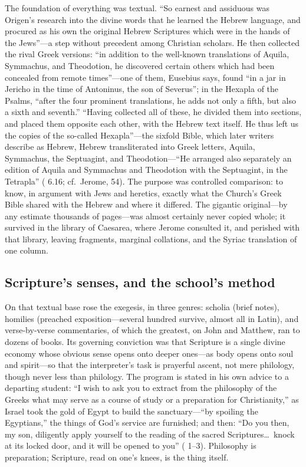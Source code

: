 The foundation of everything was textual. ``So earnest and assiduous was
Origen's research into the divine words that he learned the Hebrew language,
and procured as his own the original Hebrew Scriptures which were in the
hands of the Jews''---a step without precedent among Christian scholars. He
then collected the rival Greek versions: ``in addition to the well-known
translations of Aquila, Symmachus, and Theodotion, he discovered certain
others which had been concealed from remote times''---one of them, Eusebius
says, found ``in a jar in Jericho in the time of Antoninus, the son of
Severus''; in the Hexapla of the Psalms, ``after the four prominent
translations, he adds not only a fifth, but also a sixth and seventh.'' ``Having collected all of these, he divided them into sections, and
placed them opposite each other, with the Hebrew text itself. He thus left
us the copies of the so-called Hexapla''---the sixfold Bible, which later
writers describe as Hebrew, Hebrew transliterated into Greek letters,
Aquila, Symmachus, the Septuagint, and Theodotion---``He arranged also
separately an edition of Aquila and Symmachus and Theodotion with the
Septuagint, in the Tetrapla'' ( 6.16; cf.\ Jerome,
 54). The purpose was controlled
comparison: to know, in argument with Jews and heretics, exactly what the
Church's Greek Bible shared with the Hebrew and where it differed. The
gigantic original---by any estimate thousands of pages---was almost
certainly never copied whole; it survived in the library of Caesarea, where
Jerome consulted it, and perished with that library, leaving fragments,
marginal collations, and the Syriac translation of one column.

\subsection{Scripture's senses, and the school's method}

On that textual base rose the exegesis, in three genres: scholia (brief
notes), homilies (preached exposition---several hundred survive, almost all
in Latin), and verse-by-verse commentaries, of which the greatest, on John
and Matthew, ran to dozens of books. Its governing conviction was that
Scripture is a single divine economy whose obvious sense opens onto deeper
ones---as body opens onto soul and spirit---so that the interpreter's task
is prayerful ascent, not mere philology, though never less than philology.
The program is stated in his own advice to a departing student: ``I wish to
ask you to extract from the philosophy of the Greeks what may serve as a
course of study or a preparation for Christianity,'' as Israel took the gold
of Egypt to build the sanctuary---``by spoiling the Egyptians,'' the things
of God's service are furnished; and then: ``Do you then, my son, diligently
apply yourself to the reading of the sacred Scriptures\ldots\ knock at its
locked door, and it will be opened to you'' (
1--3). Philosophy is preparation; Scripture, read on one's knees, is the
thing itself.

